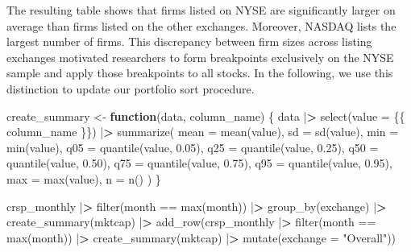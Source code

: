 \documentclass[
]{book}
\newenvironment{Shaded}{\begin{snugshade}}{\end{snugshade}}
\newcommand{\AttributeTok}[1]{\textcolor[rgb]{0.61,0.61,0.61}{#1}}
\newcommand{\ControlFlowTok}[1]{\textcolor[rgb]{0.27,0.27,0.27}{\textbf{#1}}}
\newcommand{\ErrorTok}[1]{\textcolor[rgb]{0.14,0.14,0.14}{\textbf{#1}}}
\newcommand{\FloatTok}[1]{\textcolor[rgb]{0.06,0.06,0.06}{#1}}
\newcommand{\FunctionTok}[1]{\textcolor[rgb]{0,0,0}{#1}}
\newcommand{\NormalTok}[1]{#1}
\newcommand{\OtherTok}[1]{\textcolor[rgb]{0.37,0.37,0.37}{#1}}
\newcommand{\SpecialCharTok}[1]{\textcolor[rgb]{0,0,0}{#1}}
\newcommand{\StringTok}[1]{\textcolor[rgb]{0.5,0.5,0.5}{#1}}
\begin{document}
The resulting table shows that firms listed on NYSE are significantly larger on average than firms listed on the other exchanges. Moreover, NASDAQ lists the largest number of firms. This discrepancy between firm sizes across listing exchanges motivated researchers to form breakpoints exclusively on the NYSE sample and apply those breakpoints to all stocks. In the following, we use this distinction to update our portfolio sort procedure.

\begin{Shaded}
\begin{Highlighting}[]
\NormalTok{create\_summary }\OtherTok{\textless{}{-}} \ControlFlowTok{function}\NormalTok{(data, column\_name) \{}
\NormalTok{  data }\SpecialCharTok{|}\ErrorTok{\textgreater{}}
    \FunctionTok{select}\NormalTok{(}\AttributeTok{value =}\NormalTok{ \{\{ column\_name \}\}) }\SpecialCharTok{|}\ErrorTok{\textgreater{}}
    \FunctionTok{summarize}\NormalTok{(}
      \AttributeTok{mean =} \FunctionTok{mean}\NormalTok{(value),}
      \AttributeTok{sd =} \FunctionTok{sd}\NormalTok{(value),}
      \AttributeTok{min =} \FunctionTok{min}\NormalTok{(value),}
      \AttributeTok{q05 =} \FunctionTok{quantile}\NormalTok{(value, }\FloatTok{0.05}\NormalTok{),}
      \AttributeTok{q25 =} \FunctionTok{quantile}\NormalTok{(value, }\FloatTok{0.25}\NormalTok{),}
      \AttributeTok{q50 =} \FunctionTok{quantile}\NormalTok{(value, }\FloatTok{0.50}\NormalTok{),}
      \AttributeTok{q75 =} \FunctionTok{quantile}\NormalTok{(value, }\FloatTok{0.75}\NormalTok{),}
      \AttributeTok{q95 =} \FunctionTok{quantile}\NormalTok{(value, }\FloatTok{0.95}\NormalTok{),}
      \AttributeTok{max =} \FunctionTok{max}\NormalTok{(value),}
      \AttributeTok{n =} \FunctionTok{n}\NormalTok{()}
\NormalTok{    )}
\NormalTok{\}}

\NormalTok{crsp\_monthly }\SpecialCharTok{|}\ErrorTok{\textgreater{}}
  \FunctionTok{filter}\NormalTok{(month }\SpecialCharTok{==} \FunctionTok{max}\NormalTok{(month)) }\SpecialCharTok{|}\ErrorTok{\textgreater{}}
  \FunctionTok{group\_by}\NormalTok{(exchange) }\SpecialCharTok{|}\ErrorTok{\textgreater{}}
  \FunctionTok{create\_summary}\NormalTok{(mktcap) }\SpecialCharTok{|}\ErrorTok{\textgreater{}}
  \FunctionTok{add\_row}\NormalTok{(crsp\_monthly }\SpecialCharTok{|}\ErrorTok{\textgreater{}}
    \FunctionTok{filter}\NormalTok{(month }\SpecialCharTok{==} \FunctionTok{max}\NormalTok{(month)) }\SpecialCharTok{|}\ErrorTok{\textgreater{}}
    \FunctionTok{create\_summary}\NormalTok{(mktcap) }\SpecialCharTok{|}\ErrorTok{\textgreater{}}
    \FunctionTok{mutate}\NormalTok{(}\AttributeTok{exchange =} \StringTok{"Overall"}\NormalTok{))}
\end{Highlighting}
\end{Shaded}
\end{document}
